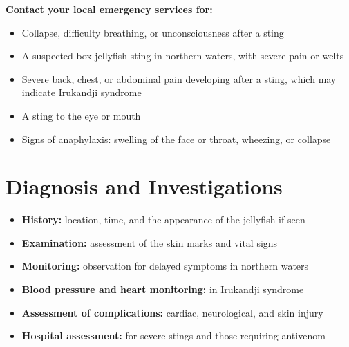 \textbf{Contact your local emergency services for:}
\begin{itemize}
    \item Collapse, difficulty breathing, or unconsciousness after a sting
    \item A suspected box jellyfish sting in northern waters, with severe pain or welts
    \item Severe back, chest, or abdominal pain developing after a sting, which may indicate Irukandji syndrome
    \item A sting to the eye or mouth
    \item Signs of anaphylaxis: swelling of the face or throat, wheezing, or collapse
\end{itemize}

\section*{Diagnosis and Investigations}
\begin{itemize}
    \item \textbf{History:} location, time, and the appearance of the jellyfish if seen
    \item \textbf{Examination:} assessment of the skin marks and vital signs
    \item \textbf{Monitoring:} observation for delayed symptoms in northern waters
    \item \textbf{Blood pressure and heart monitoring:} in Irukandji syndrome
    \item \textbf{Assessment of complications:} cardiac, neurological, and skin injury
    \item \textbf{Hospital assessment:} for severe stings and those requiring antivenom
\end{itemize}

